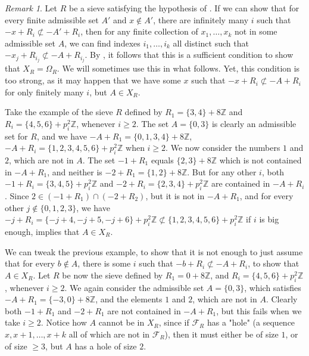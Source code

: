 \documentclass[a4paper,11pt,reqno]{amsart}
\theoremstyle{plain}
\theoremstyle{remark}
\newtheorem{remark}[theorem]{Remark}
\newcommand{\z}{\mathbb{Z}}
\newcommand{\fr}{\mathcal{F}_R}
\begin{document}
			\begin{remark}
				\label{rmk:infinite indexes Xr OmegaR}
				Let $R$ be a sieve satisfying the hypothesis of  . If we can show that for every finite admissible set $A'$ and $x \not \in A'$, there are infinitely many $i$ such that $-x + R_i \not \subset -A'+R_i$, then for any finite collection of $x_1, \dots, x_k$ not in some admissible set $A$, we can find indexes $i_1, \dots, i_k$ all distinct such that $-x_j + R_{i_j} \not \subset -A + R_{i_j}$. By  , it follows that this is a sufficient condition to show that  $X_R = \Omega_{R}$. We will sometimes use this in what follows. Yet, this condition is too strong, as it may happen that we have some $x$ such that $-x + R_i \not \subset -A+R_i$ for only finitely many $i$, but $A \in X_R$.
				
				Take the example of the sieve $R$ defined by $R_1 = \{3,4\} + 8\z$ and $R_i = \{4,5,6\} + p_i^2\z$, whenever $i \geq 2$. The set $A = \{0,3\}$ is clearly an admissible set for $R$, and we have $-A+R_1 = \{0,1,3,4\}+8\z$, $-A+R_i = \{1,2,3,4,5,6\}+p_i^2\z$ when $i \geq 2$.  We now consider the numbers $1$ and $2$, which are not in $A$. The set $-1+R_1$ equals $ \{2,3\}+8\z$ which is not contained in $-A+R_1$, and neither is $-2+R_1 = \{1,2\}+8\z$.  But for any other $i$, both $-1+R_i = \{3,4,5\} + p_i^2\z$ and $-2+R_i = \{2,3,4\} + p_i^2\z$ are contained in $-A+R_i $. Since $2 \in (-1+R_1) \cap (-2+R_2)$, but it is not in $-A+R_1$, and for every other $j \not \in \{0,1,2,3\}$, we have $-j +R_i = \{-j+4,-j+5,-j+6\} + p_i^2\z  \not \subset \{1,2,3,4,5,6\}+p_i^2\z$ if $i$ is big enough,   implies that $A \in X_R$. 
				
			\end{remark}
			
			We can tweak the previous example, to show that it is not enough to just assume that for every $b \not \in A$, there is some $i $ such that $-b + R_{i} \not \subset -A+ R_{i}$, to show that $A \in X_R$. Let $R$ be now the sieve defined by $R_1 = 0+8\z$, and $R_i = \{4,5,6\} + p_i^2\z$, whenever $i \geq 2$. We again consider the admissible set $A = \{0,3\}$, which satisfies $-A+R_1 = \{-3,0\}+8\z$, and the elements $1$ and $2$, which are not in $A$. Clearly both $-1 + R_1$ and $-2+R_1$ are not contained in $-A+R_1$, but this fails when we take $i \geq 2$. Notice how $A$ cannot be in $X_R$, since if $\fr$ has a "hole" (a sequence $x,x+1,\dots, x+k$ all of which are not in $\fr$), then it must either be of size $1$, or of size $\geq 3$, but $A$ has a hole of size $2$.
			
\end{document}
